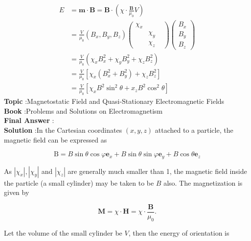 \documentclass[10pt]{article}
\begin{document}
$$
\begin{aligned}
E &=\mathbf{m} \cdot \mathbf{B}=\mathbf{B} \cdot\left(\chi \cdot \frac{\mathbf{B}}{\mu_{0}} V\right) \\
&=\frac{V}{\mu_{0}}\left(B_{x}, B_{y}, B_{z}\right)\left(\begin{array}{ccc}
\chi_{x} & \\
& \chi_{y} & \\
& \chi_{z}
\end{array}\right)\left(\begin{array}{l}
B_{x} \\
B_{y} \\
B_{z}
\end{array}\right) \\
&=\frac{V}{\mu_{0}}\left(\chi_{x} B_{x}^{2}+\chi_{y} B_{y}^{2}+\chi_{z} B_{z}^{2}\right) \\
&=\frac{V}{\mu_{0}}\left[\chi_{x}\left(B_{x}^{2}+B_{y}^{2}\right)+\chi_{z} B_{z}^{2}\right] \\
&=\frac{V}{\mu_{0}}\left[\chi_{x} B^{2} \sin ^{2} \theta+x_{z} B^{2} \cos ^{2} \theta\right]
\end{aligned}
$$
\textbf{Topic} :Magnetostatic Field and Quasi-Stationary Electromagnetic Fields\\
\textbf{Book} :Problems and Solutions on Electromagnetism\\
\textbf{Final Answer} :\\


\textbf{Solution} :In the Cartesian coordinates $(x, y, z)$ attached to a particle, the magnetic field can be expressed as

$$
\mathrm{B}=B \sin \theta \cos \varphi \mathbf{e}_{x}+B \sin \theta \sin \varphi \mathbf{e}_{y}+B \cos \theta \mathbf{e}_{z}
$$

As $\left|\chi_{x}\right|,\left|\chi_{y}\right|$ and $\left|\chi_{z}\right|$ are generally much smaller than 1, the magnetic field inside the particle (a small cylinder) may be taken to be $B$ also. The magnetization is given by

$$
\mathbf{M}=\chi \cdot \mathbf{H}=\chi \cdot \frac{\mathbf{B}}{\mu_{0}} .
$$

Let the volume of the small cylinder be $V$, then the energy of orientation is
\end{document}
